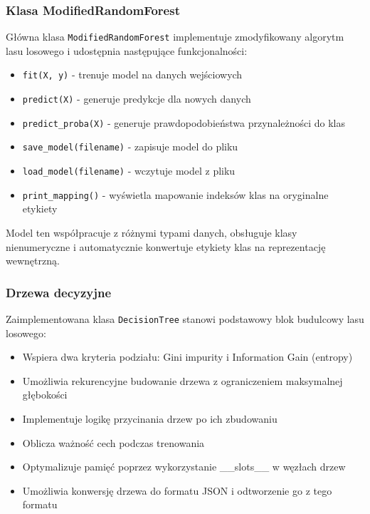 \documentclass[11pt,a4paper]{article}
\begin{document}
\subsubsection{Klasa ModifiedRandomForest}

Główna klasa \texttt{ModifiedRandomForest} implementuje zmodyfikowany algorytm lasu losowego i udostępnia następujące funkcjonalności:

\begin{itemize}
    \item \texttt{fit(X, y)} - trenuje model na danych wejściowych
    \item \texttt{predict(X)} - generuje predykcje dla nowych danych
    \item \texttt{predict\_proba(X)} - generuje prawdopodobieństwa przynależności do klas
    \item \texttt{save\_model(filename)} - zapisuje model do pliku
    \item \texttt{load\_model(filename)} - wczytuje model z pliku
    \item \texttt{print\_mapping()} - wyświetla mapowanie indeksów klas na oryginalne etykiety
\end{itemize}

Model ten współpracuje z różnymi typami danych, obsługuje klasy nienumeryczne i automatycznie konwertuje etykiety klas na reprezentację wewnętrzną.

\subsubsection{Drzewa decyzyjne}

Zaimplementowana klasa \texttt{DecisionTree} stanowi podstawowy blok budulcowy lasu losowego:

\begin{itemize}
    \item Wspiera dwa kryteria podziału: Gini impurity i Information Gain (entropy)
    \item Umożliwia rekurencyjne budowanie drzewa z ograniczeniem maksymalnej głębokości
    \item Implementuje logikę przycinania drzew po ich zbudowaniu
    \item Oblicza ważność cech podczas trenowania
    \item Optymalizuje pamięć poprzez wykorzystanie \_\_slots\_\_ w węzłach drzew
    \item Umożliwia konwersję drzewa do formatu JSON i odtworzenie go z tego formatu
\end{itemize}
\end{document}
